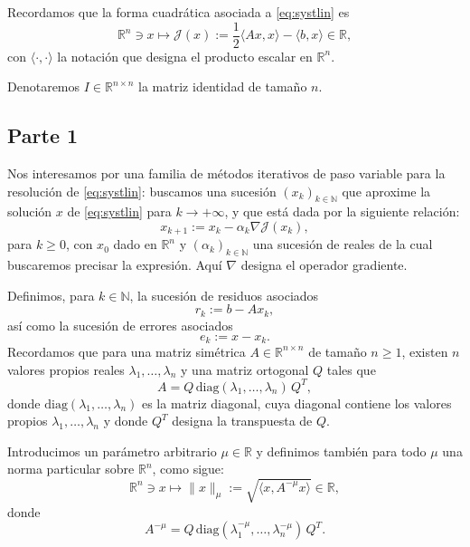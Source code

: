 \documentclass[11pt]{report}
\newcommand{\R}{\mathbb{R}}
\begin{document}
\medskip

Recordamos que la forma cuadrática asociada a \eqref{eq:systlin} es
\begin{equation}
\R^n \ni x \mapsto \mathcal{J}(x) := \frac{1}{2} \langle A x, x \rangle - \langle b, x \rangle \in \R,
\label{eq:quadratique}
\end{equation}
con $\langle \cdot, \cdot \rangle$ la notación que designa el producto escalar en $\R^n$.

\medskip

\noindent
Denotaremos $I \in \R^{n \times n}$ la matriz identidad de tamaño $n$.

\subsection*{Parte 1}

Nos interesamos por una familia de métodos iterativos de paso variable para la resolución de \eqref{eq:systlin}: buscamos una sucesión $(x_k)_{k \in \mathbb{N}}$ que aproxime la solución $x$ de \eqref{eq:systlin} para $k \to +\infty$, y que está dada por la siguiente relación:
\begin{equation}
x_{k+1} := x_k - \alpha_k \nabla \mathcal{J}(x_k),
\label{eq:iteration}
\end{equation}
para $k \geq 0$, con $x_0$ dado en $\R^n$ y $(\alpha_k)_{k \in \mathbb{N}}$ una sucesión de reales de la cual buscaremos precisar la expresión. Aquí $\nabla$ designa el operador gradiente.

\medskip

Definimos, para $k \in \mathbb{N}$, la sucesión de residuos asociados
\begin{equation}
r_k := b - A x_k,
\label{eq:residus}
\end{equation}
así como la sucesión de errores asociados
\begin{equation}
e_k := x - x_k.
\label{eq:erreurs}
\end{equation}
Recordamos que para una matriz simétrica $A \in \R^{n \times n}$ de tamaño $n \geq 1$, existen $n$ valores propios reales $\lambda_1, \ldots, \lambda_n$ y una matriz ortogonal $Q$ tales que
\[
A = Q \, \mathrm{diag}(\lambda_1, \ldots, \lambda_n) \, Q^T,
\]
donde $\mathrm{diag}(\lambda_1, \ldots, \lambda_n)$ es la matriz diagonal, cuya diagonal contiene los valores propios $\lambda_1, \ldots, \lambda_n$ y donde $Q^T$ designa la transpuesta de $Q$.

Introducimos un parámetro arbitrario $\mu \in \mathbb{R}$ y definimos también para todo $\mu$ una norma particular sobre $\R^n$, como sigue:
\begin{equation}
\R^n \ni x \mapsto \| x \|_{\mu} := \sqrt{\langle x, A^{-\mu} x \rangle} \in \R,
\label{eq:normeAmu}
\end{equation}
donde
\[
A^{-\mu} = Q \, \mathrm{diag}(\lambda_1^{-\mu}, \ldots, \lambda_n^{-\mu}) \, Q^T.
\]
\end{document}
